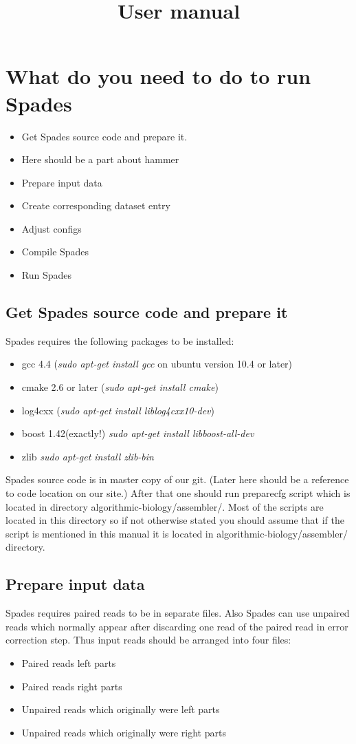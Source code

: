 \documentclass[a4paper,10pt]{article}
\title{User manual}
\begin{document}
\maketitle

\section{What do you need to do to run Spades}
\begin{itemize}
\item Get Spades source code and prepare it.
\item Here should be a part about hammer
\item Prepare input data
\item Create corresponding dataset entry
\item Adjust configs
\item Compile Spades
\item Run Spades
\end{itemize}

\subsection{Get Spades source code and prepare it}
Spades requires the following packages to be installed:
\begin{itemize}
\item gcc 4.4 ({\it sudo apt-get install gcc} on ubuntu version 10.4 or later)
\item cmake 2.6 or later ({\it sudo apt-get install cmake})
\item log4cxx ({\it sudo apt-get install liblog4cxx10-dev})
\item boost 1.42(exactly!) {\it sudo apt-get install libboost-all-dev} 
\item zlib {\it sudo apt-get install zlib-bin} 
\end{itemize}

Spades source code is in master copy of our git.
(Later here should be a reference to code location on our site.)
After that one should run preparecfg script which is located in directory algorithmic-biology/assembler/.
Most of the scripts are located in this directory so if not otherwise stated you should assume that if the script is mentioned in this manual it is located in algorithmic-biology/assembler/ directory.

\subsection{Prepare input data}
Spades requires paired reads to be in separate files.
Also Spades can use unpaired reads which normally appear after discarding one read of the paired read in error correction step.
Thus input reads should be arranged into four files:
\begin{itemize}
 \item Paired reads left parts
 \item Paired reads right parts
 \item Unpaired reads which originally were left parts
 \item Unpaired reads which originally were right parts
\end{itemize}
\end{document}

